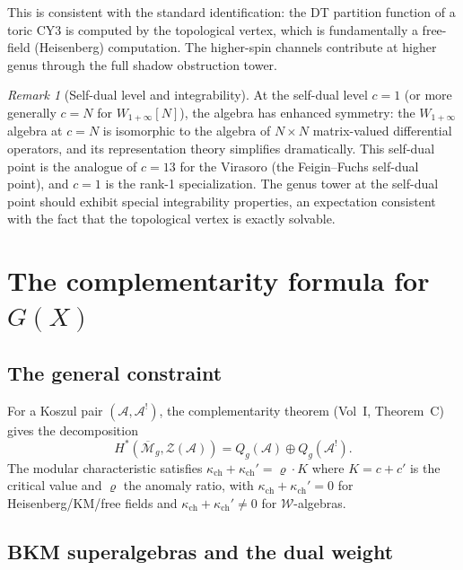 \documentclass[11pt]{article}
\theoremstyle{definition}
\theoremstyle{remark}
\newtheorem{remark}[theorem]{Remark}
\newcommand{\Mbar}{\overline{\mathcal{M}}}
\begin{document}
This is consistent with the standard identification: the DT partition
function of a toric CY3 is computed by the topological vertex, which is
fundamentally a free-field (Heisenberg) computation. The higher-spin
channels contribute at higher genus through the full shadow obstruction tower.

\begin{remark}[Self-dual level and integrability]
At the self-dual level $c = 1$ (or more generally $c = N$ for
$W_{1+\infty}[N]$), the algebra has enhanced symmetry: the
$W_{1+\infty}$ algebra at $c = N$ is isomorphic to the algebra of
$N \times N$ matrix-valued differential operators, and its representation
theory simplifies dramatically. This self-dual point is the analogue of
$c = 13$ for the Virasoro (the Feigin--Fuchs self-dual point), and $c = 1$
is the rank-1 specialization. The genus tower at the self-dual point
should exhibit special integrability properties, an expectation
consistent with the fact that the topological vertex is exactly solvable.
\end{remark}


\section{The complementarity formula for $G(X)$}
\label{sec:complementarity}

\subsection{The general constraint}

For a Koszul pair $(\mathcal{A}, \mathcal{A}^!)$, the complementarity
theorem (Vol~I, Theorem~C) gives the decomposition
\[
 H^*(\Mbar_g, \mathcal{Z}(\mathcal{A}))
 = Q_g(\mathcal{A}) \oplus Q_g(\mathcal{A}^!).
\]
The modular characteristic satisfies $\kappa_{\mathrm{ch}} + \kappa_{\mathrm{ch}}' = \varrho \cdot K$
where $K = c + c'$ is the critical value and $\varrho$ the anomaly ratio,
with $\kappa_{\mathrm{ch}} + \kappa_{\mathrm{ch}}' = 0$ for Heisenberg/KM/free fields and
$\kappa_{\mathrm{ch}} + \kappa_{\mathrm{ch}}' \neq 0$ for $\mathcal{W}$-algebras.

\subsection{BKM superalgebras and the dual weight}
\end{document}
